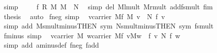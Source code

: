 \begin{isabellebody}
\ simp\isanewline
\ \ \isamarkupfalse%
\ {}{\isacharcolon}\ {\isachardoublequoteopen}f\ {\isacharparenleft}{\isasymzero}\isactrlbsub R\isactrlesub \ {\isasymodot}\isactrlbsub M\isactrlesub \ {\isasymzero}\isactrlbsub M\isactrlesub {\isacharparenright}\ {\isacharequal}\ {\isasymzero}\isactrlbsub N\isactrlesub {\isachardoublequoteclose}\ \isamarkupfalse%
\ {\isacharparenleft}simp\ del{\isacharcolon}\ M{\isachardot}lmult{\isacharunderscore}{}\ M{\isachardot}rmult{\isacharunderscore}{}\ add{\isacharcolon}f{\isacharunderscore}smult\ f{\isacharunderscore}im{\isacharparenright}\isanewline
\ \ \isamarkupfalse%
\ {}\ {}\ \isamarkupfalse%
\ {\isacharquery}thesis\ \isamarkupfalse%
\ auto\isanewline
{}\isamarkupfalse%
%
\endisatagproof
{\isafoldproof}%
%
\isadelimproof
\isanewline
%
\endisadelimproof
\isanewline
{}\isamarkupfalse%
\ f{\isacharunderscore}neg\ {\isacharbrackleft}simp{\isacharbrackright}{\isacharcolon}\isanewline
\ \ {\isachardoublequoteopen}v{\isasymin}carrier\ M{\isasymLongrightarrow}f\ {\isacharparenleft}{\isasymominus}\isactrlbsub M\isactrlesub \ v{\isacharparenright}\ {\isacharequal}\ {\isasymominus}\isactrlbsub N\isactrlesub \ f\ v{\isachardoublequoteclose}\isanewline
%
\isadelimproof
%
\endisadelimproof
%
\isatagproof
{}\isamarkupfalse%
\ {\isacharparenleft}simp\ add{\isacharcolon}\ M{\isachardot}smult{\isacharunderscore}minus{\isacharunderscore}{}{\isacharbrackleft}THEN\ sym{\isacharbrackright}\ N{\isachardot}smult{\isacharunderscore}minus{\isacharunderscore}{}{\isacharbrackleft}THEN\ sym{\isacharbrackright}\ f{\isacharunderscore}smult{\isacharparenright}%
\endisatagproof
{\isafoldproof}%
%
\isadelimproof
\isanewline
%
\endisadelimproof
\isanewline
{}\isamarkupfalse%
\ f{\isacharunderscore}minus\ {\isacharbrackleft}simp{\isacharbrackright}{\isacharcolon}\isanewline
\ \ {\isachardoublequoteopen}{\isasymlbrakk}v{\isasymin}carrier\ M{\isacharsemicolon}\ w{\isasymin}carrier\ M{\isasymrbrakk}{\isasymLongrightarrow}f\ {\isacharparenleft}v{\isasymominus}\isactrlbsub M\isactrlesub w{\isacharparenright}\ {\isacharequal}\ f\ v\ {\isasymominus}\isactrlbsub N\isactrlesub \ f\ w{\isachardoublequoteclose}\isanewline
%
\isadelimproof
%
\endisadelimproof
%
\isatagproof
{}\isamarkupfalse%
\ {\isacharparenleft}simp\ add{\isacharcolon}\ a{\isacharunderscore}minus{\isacharunderscore}def\ f{\isacharunderscore}neg\ f{\isacharunderscore}add{\isacharparenright}%

\end{isabellebody}
